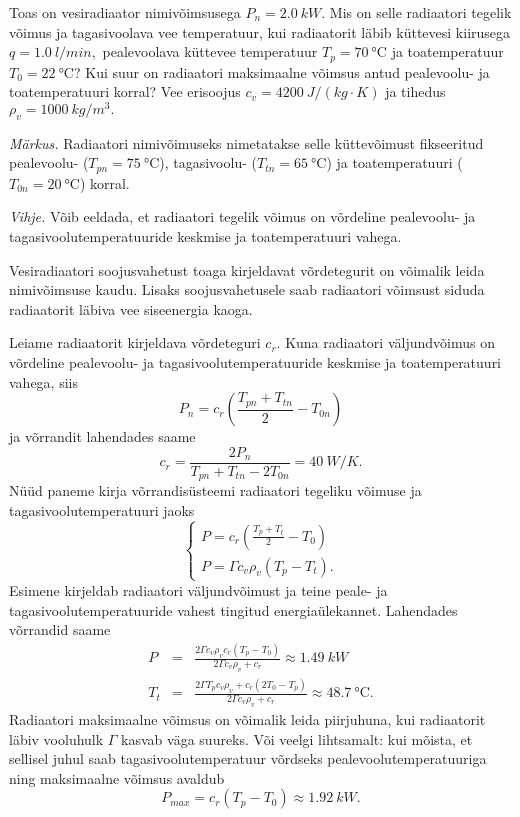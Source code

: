 
Toas on vesiradiaator nimivõimsusega $P_{n}=\SI{2.0}{kW}.$ Mis on
selle radiaatori tegelik võimus ja tagasivoolava vee temperatuur,
kui radiaatorit läbib küttevesi kiirusega $q=\SI{1.0}{l/min},$
pealevoolava küttevee temperatuur $T_{p}=\SI{70}{\degreeCelsius}$ ja toatemperatuur
$T_{0}=\SI{22}{\degreeCelsius}$? Kui suur on radiaatori maksimaalne võimsus
antud pealevoolu- ja toatemperatuuri korral? Vee erisoojus $c_{v}=\SI{4200}{J/\left(kg\cdot K\right)}$
ja tihedus $\rho_{v}=\SI{1000}{kg/m^{3}}.$

\emph{Märkus.} Radiaatori nimivõimuseks nimetatakse selle küttevõimust fikseeritud\\
pealevoolu- ($T_{pn}=\SI{75}{\degreeCelsius}$), tagasivoolu- ($T_{tn}=\SI{65}{\degreeCelsius}$)
ja toatemperatuuri ($T_{0n}=\SI{20}{\degreeCelsius}$) korral.

\emph{Vihje.} Võib eeldada, et radiaatori tegelik võimus on võrdeline pealevoolu-
ja tagasivoolutemperatuuride keskmise ja toatemperatuuri vahega.

\hint
Vesiradiaatori soojusvahetust toaga kirjeldavat võrdetegurit on võimalik leida nimivõimsuse kaudu. Lisaks soojusvahetusele saab radiaatori võimsust siduda radiaatorit läbiva vee siseenergia kaoga.

\solu
Leiame radiaatorit kirjeldava võrdeteguri $c_{r}$. Kuna radiaatori
väljundvõimus on võrdeline pealevoolu- ja tagasivoolutemperatuuride
keskmise ja toatemperatuuri vahega, siis
\[
P_{n}=c_{r}\left(\frac{T_{pn}+T_{tn}}{2}-T_{0n}\right)
\]
\noindent ja võrrandit lahendades saame
\[
c_{r}=\frac{2P_{n}}{T_{pn}+T_{tn}-2T_{0n}}=\SI{40}{W/K}.
\]
Nüüd paneme kirja võrrandisüsteemi radiaatori tegeliku võimuse ja
tagasivoolutemperatuuri jaoks
\[
\left\{ \begin{array}{c}
P=c_{r}\left(\frac{T_{p}+T_{t}}{2}-T_{0}\right)\\
P=\Gamma c_{v}\rho_{v}\left(T_{p}-T_{t}\right).
\end{array}\right.
\]
Esimene kirjeldab radiaatori väljundvõimust ja teine peale- ja tagasivoolutemperatuuride
vahest tingitud energiaülekannet. Lahendades võrrandid saame 
\begin{eqnarray*}
P & = & \frac{2\Gamma c_{v}\rho_{v}c_{r}\left(T_{p}-T_{0}\right)}{2\Gamma c_{v}\rho_{v}+c_{r}}\approx\SI{1.49}{kW}\\
T_{t} & = & \frac{2\Gamma T_{p}c_{v}\rho_{v}+c_{r}\left(2T_{0}-T_{p}\right)}{2\Gamma c_{v}\rho_{v}+c_{r}}\approx\SI{48.7}{\degreeCelsius}.
\end{eqnarray*}
Radiaatori maksimaalne võimsus on võimalik leida piirjuhuna, kui radiaatorit
läbiv vooluhulk $\Gamma$ kasvab väga suureks. Või veelgi lihtsamalt:
kui mõista, et sellisel juhul saab tagasivoolutemperatuur võrdseks
pealevoolutemperatuuriga ning maksimaalne võimsus avaldub
\[
P_{max}=c_{r}\left(T_{p}-T_{0}\right)\approx\SI{1.92}{kW}.
\]


